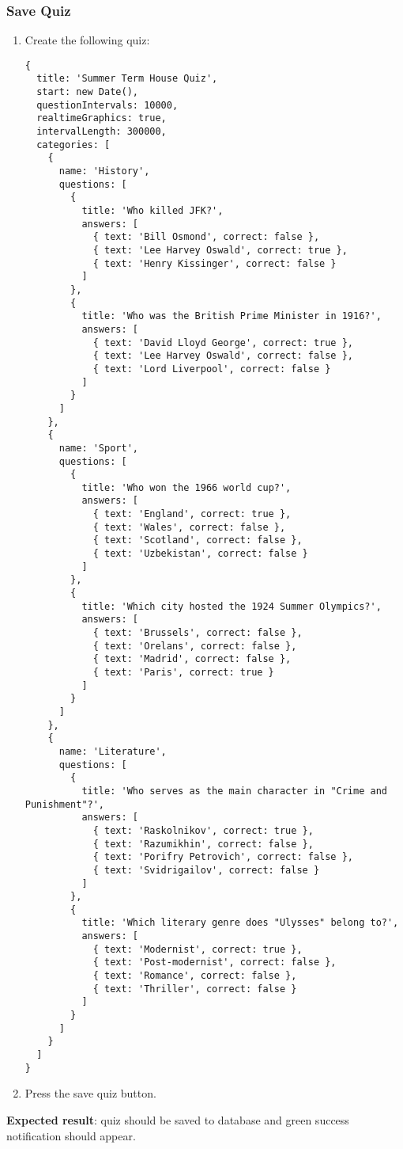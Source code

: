 \subsubsection{Save Quiz}
\begin{enumerate}[leftmargin=*]
\item Create the following quiz:
\begin{Verbatim}[fontsize=\small]
{
  title: 'Summer Term House Quiz',
  start: new Date(),
  questionIntervals: 10000,
  realtimeGraphics: true,
  intervalLength: 300000,
  categories: [
    {
      name: 'History',
      questions: [
        {
          title: 'Who killed JFK?',
          answers: [
            { text: 'Bill Osmond', correct: false },
            { text: 'Lee Harvey Oswald', correct: true },
            { text: 'Henry Kissinger', correct: false }
          ]
        },
        {
          title: 'Who was the British Prime Minister in 1916?',
          answers: [
            { text: 'David Lloyd George', correct: true },
            { text: 'Lee Harvey Oswald', correct: false },
            { text: 'Lord Liverpool', correct: false }
          ]
        }
      ]
    },
    {
      name: 'Sport',
      questions: [
        {
          title: 'Who won the 1966 world cup?',
          answers: [
            { text: 'England', correct: true },
            { text: 'Wales', correct: false },
            { text: 'Scotland', correct: false },
            { text: 'Uzbekistan', correct: false }
          ]
        },
        {
          title: 'Which city hosted the 1924 Summer Olympics?',
          answers: [
            { text: 'Brussels', correct: false },
            { text: 'Orelans', correct: false },
            { text: 'Madrid', correct: false },
            { text: 'Paris', correct: true }
          ]
        }
      ]
    },
    {
      name: 'Literature',
      questions: [
        {
          title: 'Who serves as the main character in "Crime and Punishment"?',
          answers: [
            { text: 'Raskolnikov', correct: true },
            { text: 'Razumikhin', correct: false },
            { text: 'Porifry Petrovich', correct: false },
            { text: 'Svidrigailov', correct: false }
          ]
        },
        {
          title: 'Which literary genre does "Ulysses" belong to?',
          answers: [
            { text: 'Modernist', correct: true },
            { text: 'Post-modernist', correct: false },
            { text: 'Romance', correct: false },
            { text: 'Thriller', correct: false }
          ]
        }
      ]
    }
  ]
}
\end{Verbatim}

\item Press the save quiz button.
\end{enumerate}
\textbf{Expected result}: quiz should be saved to database and green success notification should appear.
